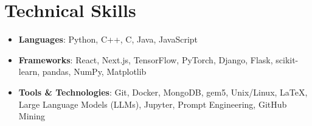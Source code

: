 \documentclass[letterpaper,10pt]{article}
\begin{document}
\section{Technical Skills}
{\normalsize
\begin{itemize}[leftmargin=0.15in, label={}, itemsep=0pt]
  \item \textbf{Languages}: Python, C++, C, Java, JavaScript
  \item \textbf{Frameworks}: React, Next.js, TensorFlow, PyTorch, Django, Flask, scikit-learn, pandas, NumPy, Matplotlib
  \item \textbf{Tools \& Technologies}: Git, Docker, MongoDB, gem5, Unix/Linux, LaTeX, Large Language Models (LLMs), Jupyter, Prompt Engineering, GitHub Mining
\end{itemize}
}
\end{document}
